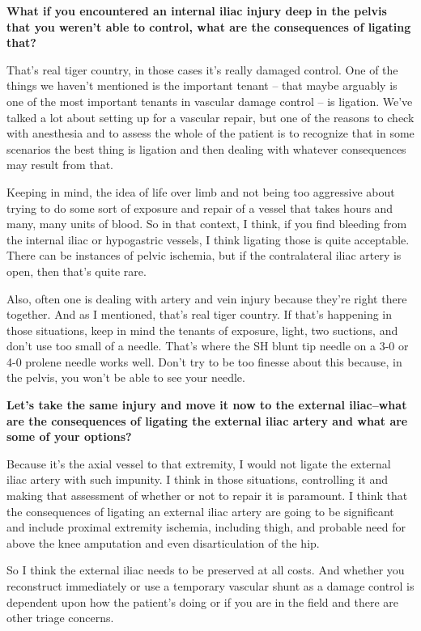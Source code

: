 \documentclass[
]{book}
\begin{document}
\textbf{What if you encountered an internal iliac injury deep in the pelvis
that you weren't able to control, what are the consequences of ligating
that?}

That's real tiger country, in those cases it's really damaged control.
One of the things we haven't mentioned is the important tenant -- that
maybe arguably is one of the most important tenants in vascular damage
control -- is ligation. We've talked a lot about setting up for a
vascular repair, but one of the reasons to check with anesthesia and to
assess the whole of the patient is to recognize that in some scenarios
the best thing is ligation and then dealing with whatever consequences
may result from that.

Keeping in mind, the idea of life over limb and not being too aggressive
about trying to do some sort of exposure and repair of a vessel that
takes hours and many, many units of blood. So in that context, I think,
if you find bleeding from the internal iliac or hypogastric vessels, I
think ligating those is quite acceptable. There can be instances of
pelvic ischemia, but if the contralateral iliac artery is open, then
that's quite rare.

Also, often one is dealing with artery and vein injury because they're
right there together. And as I mentioned, that's real tiger country. If
that's happening in those situations, keep in mind the tenants of
exposure, light, two suctions, and don't use too small of a needle.
That's where the SH blunt tip needle on a 3-0 or 4-0 prolene needle
works well. Don't try to be too finesse about this because, in the
pelvis, you won't be able to see your needle.

\textbf{Let's take the same injury and move it now to the external iliac--what
are the consequences of ligating the external iliac artery and what are
some of your options?}

Because it's the axial vessel to that extremity, I would not ligate the
external iliac artery with such impunity. I think in those situations,
controlling it and making that assessment of whether or not to repair it
is paramount. I think that the consequences of ligating an external
iliac artery are going to be significant and include proximal extremity
ischemia, including thigh, and probable need for above the knee
amputation and even disarticulation of the hip.

So I think the external iliac needs to be preserved at all costs. And
whether you reconstruct immediately or use a temporary vascular shunt as
a damage control is dependent upon how the patient's doing or if you are
in the field and there are other triage concerns.
\end{document}
